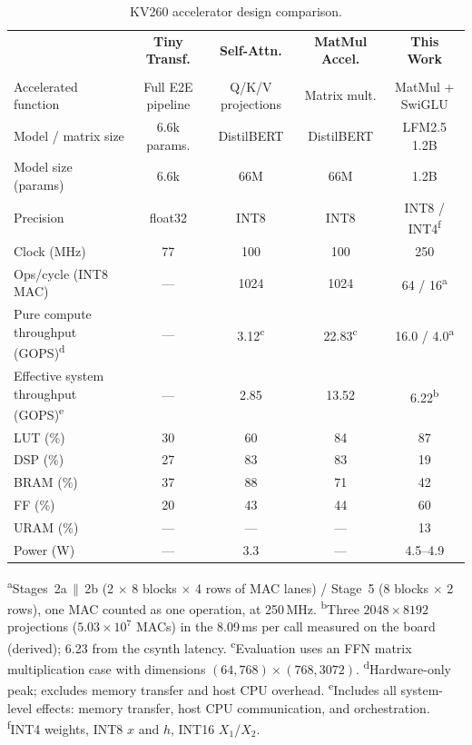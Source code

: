 \begin{table}[H]
\centering
\caption{KV260 accelerator design comparison.}
\label{tab:kv260_comparison}
\setlength{\tabcolsep}{2.5pt}
\footnotesize
\begin{tabular}{l c c c c}
\hline
 & \textbf{Tiny Transf.} & \textbf{Self-Attn.} & \textbf{MatMul Accel.} & \textbf{This Work} \\
 & \cite{11310944tin} & \cite{li2025fpgabasedhardware} & \cite{11311069} & \\
\hline
Accelerated function & Full E2E pipeline & Q/K/V projections & Matrix mult. & MatMul + SwiGLU \\
Model / matrix size & 6.6k params. & DistilBERT & DistilBERT & LFM2.5 1.2B \\
Model size (params)  & 6.6k & 66M & 66M & 1.2B \\
Precision & float32 & INT8 & INT8 & INT8 / INT4\textsuperscript{f} \\
Clock (MHz) & 77 & 100 & 100 & 250 \\
\hline
Ops/cycle (INT8 MAC) & --- & 1024 & 1024 & 64 / 16\textsuperscript{a} \\
Pure compute throughput (GOPS)\textsuperscript{d}      & --- & 3.12\textsuperscript{c} & 22.83\textsuperscript{c} & 16.0 / 4.0\textsuperscript{a} \\
Effective system throughput (GOPS)\textsuperscript{e} & --- & 2.85 & 13.52 & 6.22\textsuperscript{b} \\
\hline
LUT (\%)          & 30 & 60 & 84 & 87 \\
DSP (\%)          & 27 & 83 & 83 & 19 \\
BRAM (\%)         & 37 & 88 & 71 & 42 \\
FF (\%)           & 20 & 43 & 44 & 60 \\
URAM (\%)         & --- & --- & --- & 13 \\
\hline
Power (W)         & --- & 3.3 & --- & 4.5--4.9 \\
\hline
\end{tabular}

\par\vspace{4pt}
{\footnotesize
\textsuperscript{a}Stages~2a\,$\parallel$\,2b (2 $\times$ 8 blocks $\times$ 4 rows of
MAC lanes) / Stage~5 (8 blocks $\times$ 2 rows), one MAC counted as one operation, at
250\,MHz.
\textsuperscript{b}Three $2048 \times 8192$ projections ($5.03\times10^{7}$ MACs) in the
8.09\,ms per call measured on the board (derived); 6.23 from the csynth latency.
\textsuperscript{c}Evaluation uses an FFN matrix multiplication case with dimensions $(64,768)\times(768,3072)$.
\textsuperscript{d}Hardware-only peak; excludes memory transfer and host CPU overhead.
\textsuperscript{e}Includes all system-level effects: memory transfer, host CPU communication, and orchestration.
\textsuperscript{f}INT4 weights, INT8 $x$ and $h$, INT16 $X_1$/$X_2$.}
\end{table}

